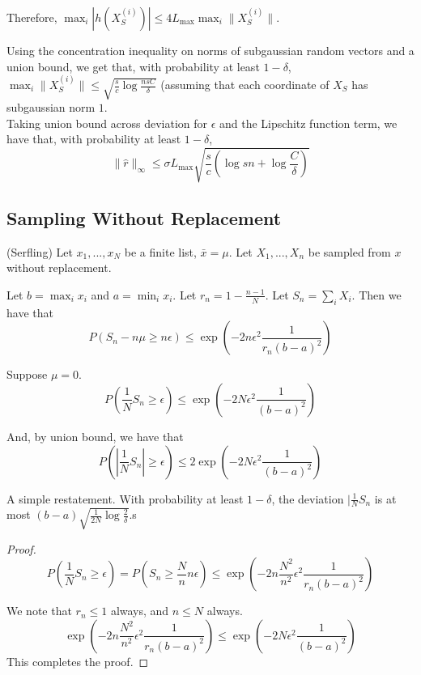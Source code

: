 \documentclass{article}
\begin{document}
Therefore, $\max_i | h(X^{(i)}_S)| \leq 4 L_{\max} \max_i \|X^{(i)}_S\|$.

Using the concentration inequality on norms of subgaussian random vectors and a union bound, we get that, with probability at least $1-\delta$, $\max_i \|X^{(i)}_S\| \leq \sqrt{ \frac{s}{c} \log \frac{nsC}{\delta} }$ (assuming that each coordinate of $X_S$ has subgaussian norm $1$.\\

Taking union bound across deviation for $\epsilon$ and the Lipschitz function term, we have that, with probability at least $1 - \delta$,
\[
\| \hat{r} \|_\infty \leq \sigma L_{\max} \sqrt{ \frac{s}{c} ( \log sn + \log \frac{C}{\delta})}
\]



\subsection{Sampling Without Replacement}

\begin{lemma} (Serfling) 
Let $x_1,..., x_N$ be a finite list, $\bar{x} = \mu$. Let $X_1,...,X_n$ be sampled from $x$ without replacement. 

Let $b = \max_i x_i$ and $a = \min_i x_i$. Let $r_n = 1- \frac{n-1}{N}$. Let $S_n = \sum_i X_i$.
Then we have that
\[
P( S_n - n \mu \geq n \epsilon) \leq \exp( - 2 n \epsilon^2 \frac{1}{r_n (b-a)^2})
\]
\end{lemma}

\begin{corollary}
Suppose $\mu = 0$. 
\[
P( \frac{1}{N} S_n \geq \epsilon) \leq \exp( -2 N \epsilon^2 \frac{1}{(b-a)^2})
\]

And, by union bound, we have that
\[
P( | \frac{1}{N} S_n| \geq \epsilon) \leq 2 \exp( -2 N \epsilon^2 \frac{1}{(b-a)^2})
\]

\end{corollary}

A simple restatement. With probability at least $1- \delta$, the deviation $| \frac{1}{N} S_n$ is at most $ (b-a) \sqrt{ \frac{1}{2N} \log \frac{2}{\delta}}$.s

\begin{proof}
\[
P( \frac{1}{N} S_n \geq \epsilon) = P( S_n \geq \frac{N}{n} n \epsilon) \leq \exp( - 2 n \frac{N^2}{n^2} \epsilon^2 \frac{1}{r_n (b-a)^2} ) 
\]

We note that $r_n \leq 1$ always, and $n \leq N$ always. 
\[
\exp( - 2 n \frac{N^2}{n^2} \epsilon^2 \frac{1}{r_n (b-a)^2} )  \leq \exp( - 2 N \epsilon^2 \frac{1}{(b-a)^2})
\]
This completes the proof.

\end{proof}
\end{document}

